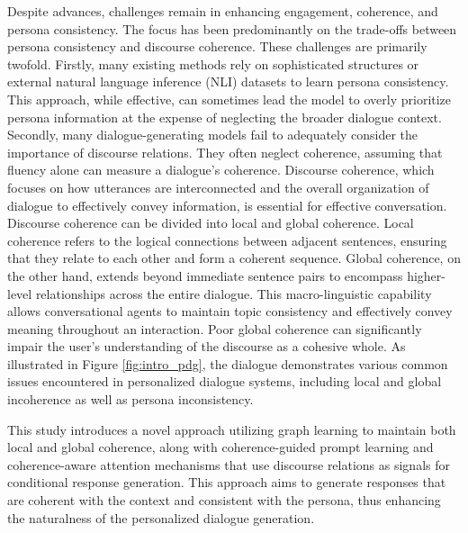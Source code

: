 \documentclass[letterpaper]{article} %
\begin{document}
Despite advances, challenges remain in enhancing engagement, coherence, and persona consistency. The focus has been predominantly on the trade-offs between persona consistency and discourse coherence. These challenges are primarily twofold. Firstly, many existing methods rely on sophisticated structures or external natural language inference (NLI) datasets to learn persona consistency. This approach, while effective, can sometimes lead the model to overly prioritize persona information at the expense of neglecting the broader dialogue context. Secondly, many dialogue-generating models fail to adequately consider the importance of discourse relations. They often neglect coherence, assuming that fluency alone can measure a dialogue's coherence. Discourse coherence, which focuses on how utterances are interconnected and the overall organization of dialogue to effectively convey information, is essential for effective conversation. Discourse coherence can be divided into local and global coherence. Local coherence refers to the logical connections between adjacent sentences, ensuring that they relate to each other and form a coherent sequence. Global coherence, on the other hand, extends beyond immediate sentence pairs to encompass higher-level relationships across the entire dialogue. This macro-linguistic capability allows conversational agents to maintain topic consistency and effectively convey meaning throughout an interaction. Poor global coherence can significantly impair the user's understanding of the discourse as a cohesive whole. As illustrated in Figure \ref{fig:intro_pdg}, the dialogue demonstrates various common issues encountered in personalized dialogue systems, including local and global incoherence as well as persona inconsistency. 

This study introduces a novel approach utilizing graph learning to maintain both local and global coherence, along with coherence-guided prompt learning and coherence-aware attention mechanisms that use discourse relations as signals for conditional response generation. This approach aims to generate responses that are coherent with the context and consistent with the persona, thus enhancing the naturalness of the personalized dialogue generation. 
\end{document}
